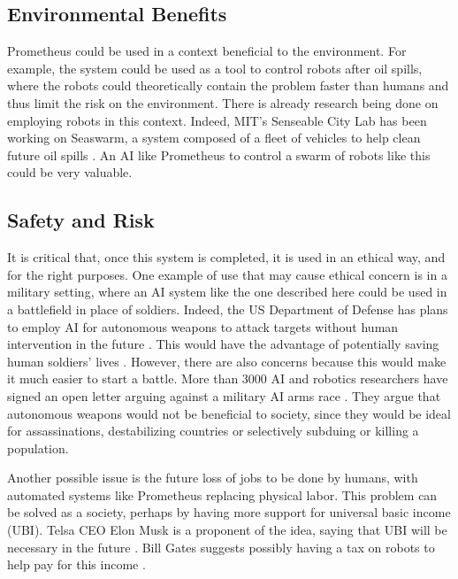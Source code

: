 \documentclass[titlepage,11pt]{article}
\begin{document}
\subsection{Environmental Benefits}

Prometheus could be used in a context beneficial to the environment. For example, the system could be used as a tool to control robots after oil spills, where the robots could theoretically contain the problem faster than humans and thus limit the risk on the environment. There is already research being done on employing robots in this context. Indeed, MIT's Senseable City Lab has been working on Seaswarm, a system composed of a fleet of vehicles to help clean future oil spills \cite{seaswarm}. An AI like Prometheus to control a swarm of robots like this could be very valuable. 

\subsection{Safety and Risk}

It is critical that, once this system is completed, it is used in an ethical way, and for the right purposes. One example of use that may cause ethical concern is in a military setting, where an AI system like the one described here could be used in a battlefield in place of soldiers. Indeed, the US Department of Defense has plans to employ AI for autonomous weapons to attack targets without human intervention in the future \cite{military}. This would have the advantage of potentially saving human soldiers' lives \cite{define_military_ai}. However, there are also concerns because this would make it much easier to start a battle. More than 3000 AI and robotics researchers have signed an open letter arguing against a military AI arms race \cite{openletter}. They argue that autonomous weapons would not be beneficial to society, since they would be ideal for assassinations, destabilizing countries or selectively subduing or killing a population.

Another possible issue is the future loss of jobs to be done by humans, with automated systems like Prometheus replacing physical labor. This problem can be solved as a society, perhaps by having more support for universal basic income (UBI). Telsa CEO Elon Musk is a proponent of the idea, saying that UBI will be necessary in the future \cite{musk}. Bill Gates suggests possibly having a tax on robots to help pay for this income \cite{gates}.
\end{document}
